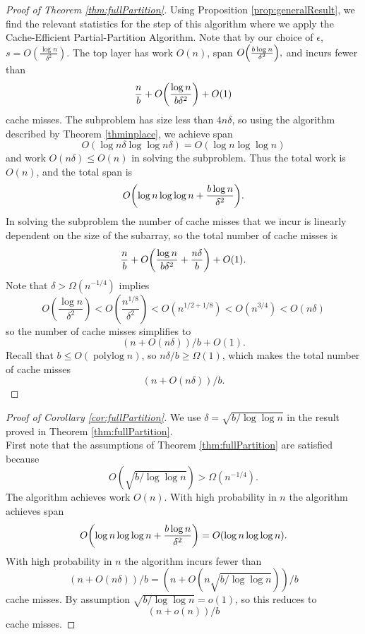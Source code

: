 \documentclass[twocolumn, twoside, 11pt]{article}
\DeclarePairedDelimiter{\paren}{(}{)}
\begin{document}
\begin{proof}[Proof of Theorem \ref{thm:fullPartition}]
	Using Proposition \ref{prop:generalResult}, we find the relevant statistics for the step of this algorithm where we apply the Cache-Efficient Partial-Partition Algorithm. 
	Note that by our choice of $\epsilon$, $s=O\left(\frac{\log n}{\delta^2}\right)$.
	The top layer has work $O(n)$, span $O\paren*{\frac{b\log n}{\delta^2}},$
	and incurs fewer than 
	$$\frac{n}{b}+O\paren*{\frac{\log n}{b\delta^2}}+O(1)$$ 
	cache misses.
	The subproblem has size less than $4n\delta$, so using the algorithm described by Theorem \ref{thminplace}, we achieve span
	$$O(\log n\delta \log\log n\delta) = O(\log n \log\log n)$$
	and work $O(n\delta) \le O(n)$ in solving the subproblem.
	Thus the total work is $O(n)$, and the total span is 
	$$O\paren*{\log n \log\log n +\frac{b\log n}{\delta^2}}.$$
	In solving the subproblem the number of cache misses that we incur is linearly dependent on the size of the subarray, so the total number of cache misses is 
	$$\frac{n}{b}+O\paren*{\frac{\log n}{b\delta^2} + \frac{n\delta}{b}}+O(1).$$ 
	Note that $\delta > \Omega(n^{-1/4})$ implies 
	$$O\left(  \frac{\log n}{\delta^2} \right) < O\left(\frac{n^{1/8}}{\delta^2}\right) < O\left(n^{1/2+1/8}\right) < O\left(n^{3/4}\right) < O(n\delta) $$
	so the number of cache misses simplifies to 
	$$(n+O(n\delta))/b + O(1).$$
	Recall that $b \le O(\operatorname{polylog}{n})$, so $n\delta / b \ge \Omega(1)$, which makes the total number of cache misses
	$$(n+O(n\delta))/b.$$

\end{proof}

\begin{proof}[Proof of Corollary \ref{cor:fullPartition}] We use $\delta = \sqrt{b/\log\log n}$ in the result proved in Theorem \ref{thm:fullPartition}. \\
	First note that the assumptions of Theorem \ref{thm:fullPartition} are satisfied because $$O(\sqrt{b/\log\log n}) > \Omega(n^{-1/4}).$$
	The algorithm achieves work $O(n)$. 
	With high probability in $n$ the algorithm achieves span 
	$$O\paren*{\log n \log\log n +\frac{b\log n}{\delta^2}} = O(\log n\log\log n).$$
	With high probability in $n$ the algorithm incurs fewer than 
	$$(n+O(n\delta))/b = (n+O(n\sqrt{b/\log\log n}))/b$$ 
	cache misses.
	By assumption $\sqrt{b/\log\log n} = o(1)$, so this reduces to 
	$$(n+o(n))/b$$
	cache misses.
\end{proof}
\end{document}
